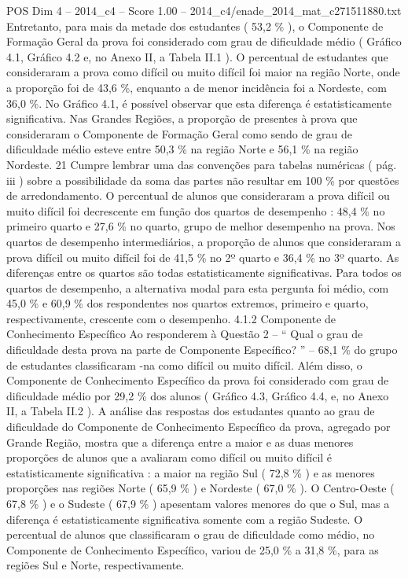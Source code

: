 \begin{textsample}{POS Dim 4 – 2014\_c4 – Score 1.00 – 2014\_c4/enade\_2014\_mat\_c271511880.txt}
Entretanto, para mais da metade dos estudantes ( 53,2 \% ), o Componente de Formação Geral da prova foi considerado com grau de dificuldade médio ( Gráfico 4.1, Gráfico 4.2 e, no Anexo II, a Tabela II.1 ).
O percentual de estudantes que consideraram a prova como difícil ou muito difícil foi maior na região Norte, onde a proporção foi de 43,6 \%, enquanto a de menor incidência foi a Nordeste, com 36,0 \%.
No Gráfico 4.1, é possível observar que esta diferença é estatisticamente significativa.
Nas Grandes Regiões, a proporção de presentes à prova que consideraram o Componente de Formação Geral como sendo de grau de dificuldade médio esteve entre 50,3 \% na região Norte e 56,1 \% na região Nordeste. 21 Cumpre lembrar uma das convenções para tabelas numéricas ( pág. iii ) sobre a possibilidade da soma das partes não resultar em 100 \% por questões de arredondamento.
O percentual de alunos que consideraram a prova difícil ou muito difícil foi decrescente em função dos quartos de desempenho : 48,4 \% no primeiro quarto e 27,6 \% no quarto, grupo de melhor desempenho na prova.
Nos quartos de desempenho intermediários, a proporção de alunos que consideraram a prova difícil ou muito difícil foi de 41,5 \% no 2º quarto e 36,4 \% no 3º quarto.
As diferenças entre os quartos são todas estatisticamente significativas.
Para todos os quartos de desempenho, a alternativa modal para esta pergunta foi médio, com 45,0 \% e 60,9 \% dos respondentes nos quartos extremos, primeiro e quarto, respectivamente, crescente com o desempenho. 4.1.2 Componente de Conhecimento Específico Ao responderem à Questão 2 – “ Qual o grau de dificuldade desta prova na parte de Componente Específico? ” – 68,1 \% do grupo de estudantes classificaram -na como difícil ou muito difícil.
Além disso, o Componente de Conhecimento Específico da prova foi considerado com grau de dificuldade médio por 29,2 \% dos alunos ( Gráfico 4.3, Gráfico 4.4, e, no Anexo II, a Tabela II.2 ).
A análise das respostas dos estudantes quanto ao grau de dificuldade do Componente de Conhecimento Específico da prova, agregado por Grande Região, mostra que a diferença entre a maior e as duas menores proporções de alunos que a avaliaram como difícil ou muito difícil é estatisticamente significativa : a maior na região Sul ( 72,8 \% ) e as menores proporções nas regiões Norte ( 65,9 \% ) e Nordeste ( 67,0 \% ).
O Centro-Oeste ( 67,8 \% ) e o Sudeste ( 67,9 \% ) apesentam valores menores do que o Sul, mas a diferença é estatisticamente significativa somente com a região Sudeste.
O percentual de alunos que classificaram o grau de dificuldade como médio, no Componente de Conhecimento Específico, variou de 25,0 \% a 31,8 \%, para as regiões Sul e Norte, respectivamente.

\end{textsample}
